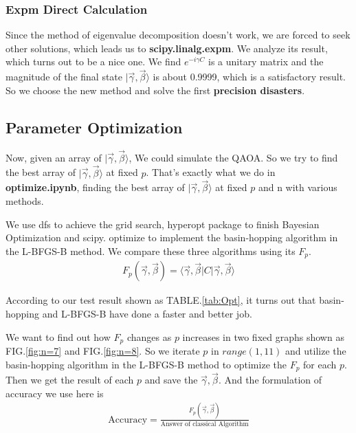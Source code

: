 \subsubsection{Expm Direct Calculation}
Since the method of eigenvalue decomposition doesn't work, we are forced to seek other solutions, which leads us to \textbf{scipy.linalg.expm}. We analyze its result, which turns out to be a nice one. We find $e^{-i\gamma C}$ is a unitary matrix and the magnitude of the final state $|\vec{\gamma}, \vec{\beta}\rangle $ is about 0.9999, which is a satisfactory result. So we choose the new method and solve the first \textbf{precision disasters}.

\subsection{Parameter Optimization}

Now, given an array of $|\vec{\gamma}, \vec{\beta}\rangle$, We could simulate the QAOA. So we try to find the best array of $|\vec{\gamma}, \vec{\beta}\rangle$ at fixed $p$. That's exactly what we do in \textbf{optimize.ipynb}, finding the best array of $|\vec{\gamma}, \vec{\beta}\rangle$ at fixed $p$ and n with various methods.

We use dfs to achieve the grid search, hyperopt package\cite{bergstra2013making} to finish Bayesian Optimization and scipy. optimize to implement the basin-hopping algorithm in the L-BFGS-B method. We compare these three algorithms using its $F_p$. 
\begin{align*}
    F_p(\vec{\gamma}, \vec{\beta}) = \langle\vec{\gamma},\vec{\beta}| C |\vec{\gamma},\vec{\beta}\rangle
\end{align*}

According to our test result shown as TABLE.\ref{tab:Opt}, it turns out that basin-hopping and L-BFGS-B have done a faster and better job. 

We want to find out how $F_p$ changes as $p$ increases in two fixed graphs shown as FIG.\ref{fig:n=7} and FIG.\ref{fig:n=8}. So we iterate $p$ in $range(1,11)$  and utilize the basin-hopping algorithm in the L-BFGS-B method to optimize the $F_p$  for each $p$. Then we get the result of each $p$ and save the $\vec{\gamma},\vec{\beta}$. And the formulation of accuracy we use here is 
\begin{align*}
    \text{Accuracy}=\frac{F_p(\vec{\gamma}, \vec{\beta})}{\text{Answer of classical Algorithm}}
\end{align*}


